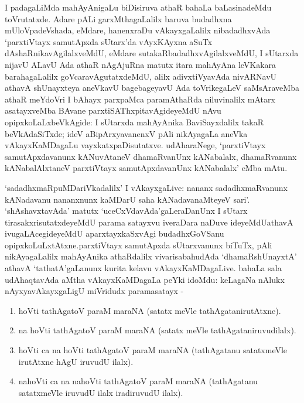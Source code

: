 I padagaLiMda mahAyAnigaLu biDisiruva athaR bahaLa baLasinadeMdu toVrutatxde. Adare pALi garxMthagaLalilx baruva budadhxna mUloVpadeVshada, eMdare, hanenxraDu vAkayxgaLalilx nibadadhxvAda `parxtiVtayx samutApxda sUtarx'da vAyxKAyxna aSuTx dAshaRnikavAgilalxveMdU, eMdare sutakaRbadadhxvAgilalxveMdU, I sUtarxda nijavU ALavU Ada athaR nAgAjuRna matutx itara mahAyAna leVKakara barahagaLalilx goVcaravAgutatxdeMdU, alilx adivxtiVyavAda nivARNavU athavA shUnayxteya aneVkavU bagebageyavU Ada toVrikegaLeV saMsAraveMba athaR meYdoVri I bAhayx parxpaMca paramAthaRda niluvinalilx mAtarx asatayxveMba BAvane parxtiSAThxpitavAgideyeMdU nAvu opipxkoLaLxbeVkAgide: I sUtarxda mahAyAnika BaviSayxdalilx takaR beVkAdaSiTxde; ideV aBipArxyavanenxV pAli nikAyagaLa aneVka vAkayxKaMDagaLu vayxkatxpaDisutatxve. udAharaNege, `parxtiVtayx samutApxdavanunx kANuvAtaneV  dhamaRvanUnx kANabalalx, dhamaRvanunx kANabalAlxtaneV parxtiVtayx samutApxdavanUnx kANabalalx' eMba mAtu.

`sadadhxmaRpuMDariVkadalilx' I vAkayxgaLive: nananx sadadhxmaRvanunx kANadavanu nananxnunx kaMDarU saha kANadavanaMteyeV sari'. `shAshavxtavAda' matutx `uceCxVdavAda'gaLera\-DanUnx I sUtarx tirasakxrisutatxdeyeMdU parama satayxvu iveraDara naDuve ideyeMdU\break athavA ivugaLAcegideyeMdU aparxtayxkaSxvAgi budadhxGoVSanu opipxkoLuLxtAtxne.\break parxtiVtayx samutApxda sUtarxvanunx biTuTx, pAli nikAyagaLalilx mahAyAnika athaRdalilx vivarisabahudAda `dhamaRshUnayxtA' athavA `tathatA'gaLanunx kurita kelavu vAkayxKaMDa\-gaLive. bahaLa sala udAhaqtavAda aMtha vAkayxKaMDagaLa peYki idoMdu: keLagaNa nAlukx nAyxyavAkayxgaLigU miVridudx paramasatayx -
\begin{enumerate}
\renewcommand{\theenumi}{\arabic{enumi}}
\renewcommand{\labelenumi}{(\theenumi)}
\item hoVti tathAgatoV paraM maraNA (satatx meVle tathAgatanirutAtxne).
\item na hoVti tathAgatoV paraM maraNA (satatx meVle tathAgataniruvudilalx).
\item hoVti ca na hoVti tathAgatoV paraM maraNA (tathAgatanu satatxmeVle irutAtxne hAgU iruvudU ilalx).
\item nahoVti ca na nahoVti tathAgatoV paraM maraNA (tathAgatanu satatxmeVle iruvudU ilalx iradiruvudU ilalx).
\end{enumerate}


